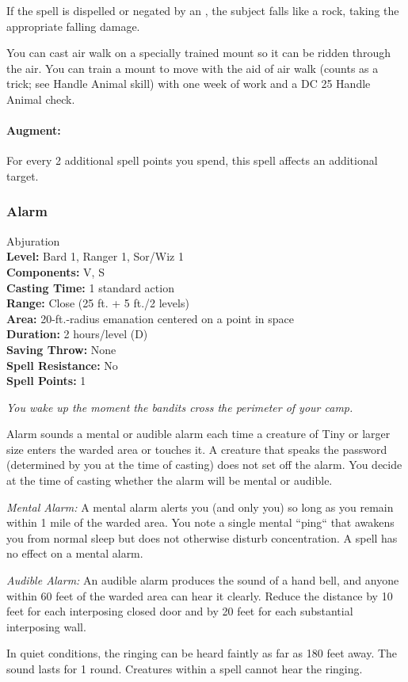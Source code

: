 If the spell is dispelled or negated by an , the subject falls like a rock, taking the appropriate falling damage.

You can cast air walk on a specially trained mount so it can be ridden through the air. 
You can train a mount to move with the aid of air walk (counts as a trick; see Handle Animal skill) with one week of work and a DC 25 Handle Animal check.

\paragraph{Augment:} For every 2 additional spell points you spend, this spell affects an additional target.
\subsubsection{Alarm}
\label{Spell:Alarm}
Abjuration
\\ \textbf{Level:} Bard 1, Ranger 1, Sor/Wiz 1
\\ \textbf{Components:} V, S
\\ \textbf{Casting Time:} 1 standard action
\\ \textbf{Range:} Close (25 ft. + 5 ft./2 levels)
\\ \textbf{Area:} 20-ft.-radius emanation centered on a point in space
\\ \textbf{Duration:} 2 hours/level (D)
\\ \textbf{Saving Throw:} None
\\ \textbf{Spell Resistance:} No
\\ \textbf{Spell Points:} 1

\emph{You wake up the moment the bandits cross the perimeter of your camp.}

Alarm sounds a mental or audible alarm each time a creature of Tiny or larger size enters the warded area or touches it. 
A creature that speaks the password (determined by you at the time of casting) does not set off the alarm. 
You decide at the time of casting whether the alarm will be mental or audible.

\begin{list}{}{\leftmargin=1em}
 \item \emph{Mental Alarm:} A mental alarm alerts you (and only you) so long as you remain within 1 mile of the warded area. 
You note a single mental ``ping`` that awakens you from normal sleep but does not otherwise disturb concentration. 
A  spell has no effect on a mental alarm.
 \item \emph{Audible Alarm:} An audible alarm produces the sound of a hand bell, and anyone within 60 feet of the warded area can hear it clearly. 
Reduce the distance by 10 feet for each interposing closed door and by 20 feet for each substantial interposing wall.

In quiet conditions, the ringing can be heard faintly as far as 180 feet away. 
The sound lasts for 1 round. Creatures within a  spell cannot hear the ringing.
\end{list}

